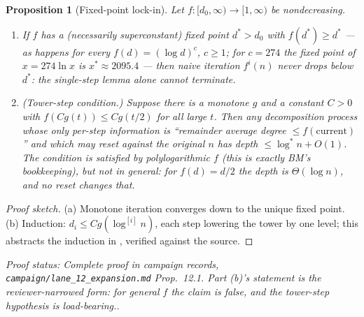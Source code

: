 \documentclass[a4paper,11pt]{amsart}
\newtheorem{proposition}[theorem]{Proposition}
\theoremstyle{definition}
\theoremstyle{remark}
\newcommand{\proofsrc}[1]{\par\smallskip\noindent\begin{sloppypar}\small\emph{Proof status: #1.}\end{sloppypar}\par\smallskip}
\begin{document}
\begin{proposition}[Fixed-point lock-in]\label{prop:lockin}
Let $f\colon[d_0,\infty)\to[1,\infty)$ be nondecreasing.
\begin{enumerate}
\item[(a)] If $f$ has a (necessarily superconstant) fixed point $d^*>d_0$ with $f(d^*)\ge d^*$ --- as
happens for every $f(d)=(\log d)^c$, $c\ge1$; for $c=274$ the fixed point of $x=274\ln x$ is
$x^*\approx2095.4$ --- then naive iteration $f^{i}(n)$ never drops below $d^*$: the single-step lemma alone
cannot terminate.
\item[(b)] \emph{(Tower-step condition.)} Suppose there is a monotone $g$ and a constant $C>0$ with
$f(Cg(t))\le Cg(t/2)$ for all large $t$. Then any decomposition process whose only per-step information is
``remainder average degree $\le f(\text{current})$'' and which may reset against the original $n$ has depth
$\le\log^* n+O(1)$. The condition is satisfied by polylogarithmic $f$ (this is exactly BM's bookkeeping),
but not in general: for $f(d)=d/2$ the depth is $\Theta(\log n)$, and no reset changes that.
\end{enumerate}
\end{proposition}
\begin{proof}[Proof sketch]
(a) Monotone iteration converges down to the unique fixed point. (b) Induction:
$d_i\le Cg(\log^{[i]}n)$, each step lowering the tower by one level; this abstracts the induction in
\cite{BM22}, verified against the source.
\end{proof}
\proofsrc{Complete proof in campaign records, \texttt{campaign/lane\_12\_expansion.md} Prop.~12.1. Part
(b)'s statement is the reviewer-narrowed form: for general $f$ the claim is false, and the tower-step
hypothesis is load-bearing.}
\end{document}
